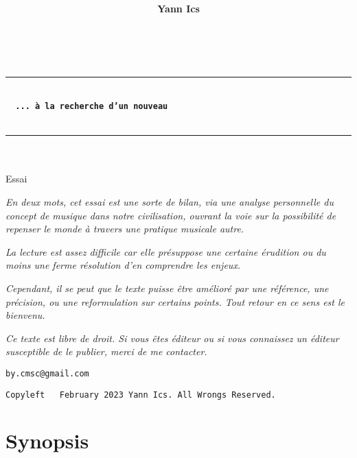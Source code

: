 \documentclass{article}
\title{
}
\author{\textsf{\textbf{Yann Ics}}}
\date{}
\begin{document}
\makeatletter
  \begin{titlepage}
  \centering
  {\Large \@author} \\
  \rule{\linewidth}{.5pt}
  \vspace{4cm}
  {\LARGE \textbf{\@title}} \\
   \vspace{6 mm}
   {\color{brown} {\Large \textbf{\texttt{\, ... à la recherche d'un nouveau}}}}\\
   \vspace{2mm}
   {}\\
  \vfill
  \rule{\linewidth}{.5pt}
     {\Large \textsf{\textsl{}}}\\ 
     {\Large \textsf{\textsl{}}}\\ 	
     {\Large \textsf{Essai}}\\
\end{titlepage}
\makeatother

\pagecolor{white}

{\footnotesize
\vspace*{2cm}
 \textsl{En deux mots, cet essai est une sorte de bilan, via une analyse personnelle du concept de musique dans notre civilisation, ouvrant la voie sur la possibilité de repenser le monde à travers une pratique musicale autre.}
\bigskip

\textsl{La lecture est assez difficile car elle présuppose une certaine érudition ou du moins une ferme résolution d’en comprendre les enjeux. }
\bigskip

\textsl{Cependant, il se peut que le texte puisse être amélioré par une référence, une précision, ou une reformulation sur certains points. Tout retour en ce sens est le bienvenu.}
\bigskip

\textsl{Ce texte est libre de droit. Si vous êtes éditeur ou si vous connaissez un éditeur susceptible de le publier, merci de me contacter.}
\bigskip

\texttt{by.cmsc@gmail.com}}

\vspace*{\fill}
\begin{center} 
 \texttt{Copyleft \textcopyleft \, February 2023 Yann Ics. All Wrongs Reserved.}
 \end{center} 

\newpage

\section*{Synopsis}
\end{document}
